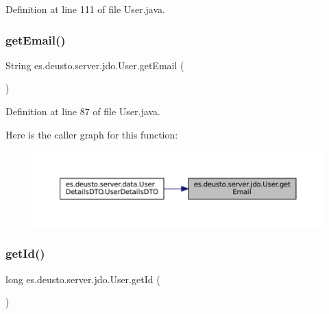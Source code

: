 Definition at line 111 of file User.\+java.

\mbox{\label{classes_1_1deusto_1_1server_1_1jdo_1_1_user_aa1ba6d9e3d0572b90dac6ff627ee3f95}} 
\subsubsection{\texorpdfstring{getEmail()}{getEmail()}}
{\footnotesize\ttfamily String es.\+deusto.\+server.\+jdo.\+User.\+get\+Email (\begin{DoxyParamCaption}{ }\end{DoxyParamCaption})}



Definition at line 87 of file User.\+java.

Here is the caller graph for this function\+:
\nopagebreak
\begin{figure}[H]
\begin{center}
\leavevmode
\includegraphics[width=350pt]{classes_1_1deusto_1_1server_1_1jdo_1_1_user_aa1ba6d9e3d0572b90dac6ff627ee3f95_icgraph}
\end{center}
\end{figure}
\mbox{\label{classes_1_1deusto_1_1server_1_1jdo_1_1_user_ac116b1ec523da06c6776eaa76c910125}} 
\subsubsection{\texorpdfstring{getId()}{getId()}}
{\footnotesize\ttfamily long es.\+deusto.\+server.\+jdo.\+User.\+get\+Id (\begin{DoxyParamCaption}{ }\end{DoxyParamCaption})}



